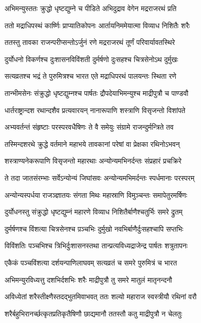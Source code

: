 \twolineshloka
{अभिमन्युस्ततः क्रुद्धो धृष्टद्युम्ने च पीडिते}
{अभिदुद्राव वेगेन मद्रराजरथं प्रति}


\twolineshloka
{ततो मद्राधिपस्थं कार्ष्णिः प्राप्यातिकोपनः}
{आर्तायनिममेयात्मा विव्याध निशितैः शरैः}


\twolineshloka
{ततस्तु तावका राजन्परीप्सन्तोऽर्जुनं रणे}
{मद्रराजरथं तूर्णं परिवार्यावतस्थिरे}


\twolineshloka
{दुर्योधनो विकर्णश्च दुःशासनविविंशती}
{दुर्मर्षणो दुःसहश्च चित्रसेनोऽथ दुर्मुखः}


\twolineshloka
{सत्यव्रतश्च भद्रं ते पुरुमित्रश्च भारत}
{एते मद्राधिपरथं पालयन्तः स्थिता रणे}


\twolineshloka
{तान्भीमसेनः संक्रुद्धो धृष्टद्युम्नश्च पार्षतः}
{द्रौपदेयाभिमन्युश्च माद्रीपुत्रौ च पाण्डवौ}


\twolineshloka
{धार्तराष्ट्रान्दश रथान्दशैव प्रत्यवारयन्}
{नानारूपाणि शस्त्राणि विसृजन्तो विशांपते}


\twolineshloka
{अभ्यवर्तन्तं संहृष्टाः परस्परवधैषिणः}
{ते वै समेयुः संग्रामे राजन्दुर्मन्त्रिते तव}


\twolineshloka
{तस्मिन्दशरथे क्रुद्धे वर्तमाने महाभये}
{तावकानां परेषां वा प्रेक्षका रथिनोऽभवन्}


\twolineshloka
{शस्त्राण्यनेकरूपाणि विसृजन्तो महारथाः}
{अन्योन्यमभिनर्दन्तः संप्रहारं प्रचक्रिरे}


\twolineshloka
{ते तदा जातसंरम्भाः सर्वेऽन्योन्यं जिघांसवः}
{अन्योन्यमभिमर्दन्तः स्पर्धमानाः परस्परम्}


\twolineshloka
{अन्योन्यस्पर्धया राजञ्ज्ञातयः संगता मिथः}
{महास्राणि विमुञ्चन्तः समापेतुरमर्षिणः}


\twolineshloka
{दुर्योधनस्तु संक्रुद्धो धृष्टद्युम्नं महारणे}
{विव्याध निशितैर्बाणैश्चतुर्भिः समरे द्रुतम्}


\twolineshloka
{दुर्मर्षणश्च विंशत्या चित्रसेनश्च प़ञ्चभिः}
{दुर्मुखो नवभिर्बाणैर्दुःसहश्चापि सप्तभिः}


\twolineshloka
{विविंशतिः पञ्चभिश्च त्रिभिर्दुःशासनस्तथा}
{तान्प्रत्यविध्यद्राजेन्द्र पार्षतः शत्रुतापनः}


\twolineshloka
{एकैकं पञ्चविंशत्या दर्शयन्पाणिलाघवम्}
{सत्यव्रतं च समरे पुरुमित्रं च भारत}


\twolineshloka
{अभिमन्युरविध्यत्तु दशभिर्दशभिः शरैः}
{माद्रीपुत्रौ तु समरे मातुलं मातृनन्दनौ}


\twolineshloka
{अविध्येतां शरैस्तीक्ष्णैस्तदद्भुतमिवाभवत्}
{ततः शल्यो महाराज स्वस्त्रीयौ रथिनां वरौ}


\twolineshloka
{शरैर्बहुभिरानर्च्छत्कृतप्रतिकृतैषिणौ}
{छाद्यमानौ ततस्तौ कतु माद्रीपुत्रौ न चेलतुः}


